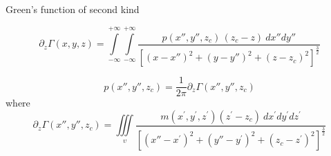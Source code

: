 Green's function of second kind \citep{roy1962}

\citep[][ p. 246]{kellogg1967}




\begin{equation}
	\partial_{z} \Gamma(x, y, z) = \int\limits_{-\infty}^{+\infty}\int\limits_{-\infty}^{+\infty}
	\frac{p(x'', y'', z_{c}) \, (z_{c} - z) \: dx'' dy''}
	{\left[ (x-x'')^2 + (y-y'')^2 + (z-z_{c})^2 \right]^{\frac{3}{2}}}
	\label{eq:DzPhi-surface-integral}
\end{equation}

\begin{equation}
	p(x'', y'', z_{c}) = \frac{1}{2\pi} \partial_{z} \Gamma(x'', y'', z_{c})
	\label{eq:function-p}
\end{equation}
where
\begin{equation}
	\partial_{z} \Gamma(x'', y'', z_{c}) = \iiint\limits_{\upsilon} 
	\frac{m(x^{\prime}, y^{\prime}, z^{\prime}) (z^{\prime} - z_{c}) \: dx^{\prime} dy^{\prime} dz^{\prime}}
	{\left[ (x''-x^{\prime})^2 + (y''-y^{\prime})^2 + (z_{c}-z^{\prime})^2 \right]^{\frac{3}{2}}}
	\label{eq:DzGamma-volume-integral}
\end{equation}

